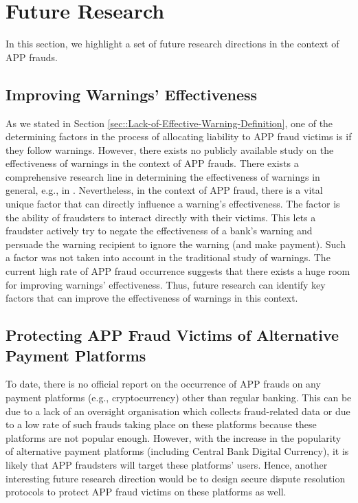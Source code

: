 

\section{Future Research}\label{sec::Future-Research}


In this section, we highlight a set of future research directions in the context of APP frauds. 




\subsection{Improving Warnings' Effectiveness}

As we stated in  Section \ref{sec::Lack-of-Effective-Warning-Definition},  one of the determining factors in the process of allocating liability to APP fraud victims is if they follow warnings. However,  there exists no publicly available study on the effectiveness of warnings in  the context of APP frauds. There exists a comprehensive research line in determining the effectiveness of warnings in general, e.g., in \cite{brinton2016users,felt2014experimenting,laughery2006designing}. 
%
%
Nevertheless, in the context of APP fraud, there is a vital unique factor that can directly influence a warning's effectiveness. The factor is the ability of  fraudsters to interact directly with their victims. This lets a fraudster actively try to negate the effectiveness of a bank's warning and persuade the warning recipient to ignore the warning (and make payment). Such a factor was not taken into account in the traditional study of warnings. The current high rate of  APP fraud occurrence suggests that there exists a huge room for improving warnings' effectiveness. Thus, future research can identify key factors that can improve the effectiveness of warnings in this context. 

\vspace{-.5mm}
\subsection{Protecting APP Fraud Victims of Alternative Payment Platforms}

To date, there is no official report on the occurrence of APP frauds on any payment platforms (e.g., cryptocurrency) other than regular banking. This can be due to a lack of an oversight organisation which collects fraud-related data or due to a low rate of such frauds taking place on these platforms because these platforms are not popular enough. However,  with the increase in the popularity of alternative payment platforms (including Central Bank Digital Currency), it is likely that APP fraudsters will target these platforms' users. Hence, another interesting future research direction would be to design secure dispute resolution protocols to protect  APP fraud victims on these platforms as well. 

